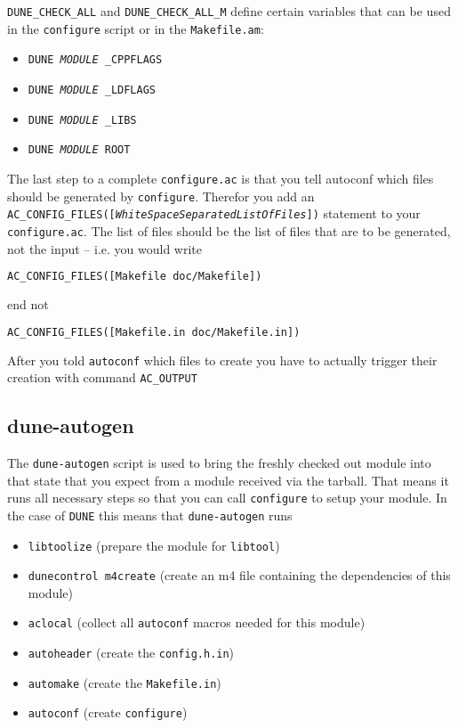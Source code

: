 \documentclass[11pt,a4paper,headinclude,footinclude,DIV16,normalheadings]{scrartcl}
\newcommand{\dune}{\texttt{DUNE}\xspace}
\newcommand{\autoconf}{\texttt{autoconf}\xspace}
\newcommand{\autogen}{\texttt{dune-autogen}\xspace}
\newcommand{\libtool}{\texttt{libtool}\xspace}
\newcommand{\configure}{\texttt{configure}\xspace}
\newcommand{\configureac}{\texttt{configure.ac}\xspace}
\newcommand{\makefilein}{\texttt{Makefile.in}\xspace}
\newcommand{\makefileam}{\texttt{Makefile.am}\xspace}
\begin{document}
\texttt{DUNE\_CHECK\_ALL} and \texttt{DUNE\_CHECK\_ALL\_M} define certain
variables that can be used in the \configure script or in the
\makefileam:

\begin{itemize}
\item \texttt{DUNE\textit{\,MODULE\,}\_CPPFLAGS}
\item \texttt{DUNE\textit{\,MODULE\,}\_LDFLAGS}
\item \texttt{DUNE\textit{\,MODULE\,}\_LIBS}
\item \texttt{DUNE\textit{\,MODULE\,}ROOT}
\end{itemize}

The last step to a complete \configureac is that you tell autoconf
which files should be generated by \configure. Therefor you add an
\texttt{AC\_CONFIG\_FILES([\textit{WhiteSpaceSeparatedListOfFiles}])}
statement to your \configureac. The list of files should be the list
of files that are to be generated, not the input -- i.e. you would
write
\begin{lstlisting}[language=make]
AC_CONFIG_FILES([Makefile doc/Makefile])
\end{lstlisting}
end not
\begin{lstlisting}[language=make]
AC_CONFIG_FILES([Makefile.in doc/Makefile.in])
\end{lstlisting}
After you told \autoconf which files to create you have to actually
trigger their creation with command \texttt{AC\_OUTPUT}

\subsection{dune-autogen}
\label{autogen}

The \autogen script is used to bring the freshly checked out module
into that state that you expect from a module received via the
tarball. That means it runs all necessary steps so that you can call
\configure to setup your module. In the case of \dune this means that
\autogen runs
\begin{itemize}
\item \texttt{libtoolize} (prepare the module for \libtool)
\item \texttt{dunecontrol m4create} (create an m4 file containing the
  dependencies of this module)
\item \texttt{aclocal} (collect all \autoconf macros needed for this module)
\item \texttt{autoheader} (create the \texttt{config.h.in})
\item \texttt{automake} (create the \makefilein)
\item \texttt{autoconf} (create \configure)
\end{itemize}
\end{document}
